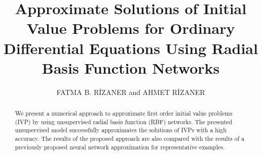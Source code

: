 \documentclass{mc}
\begin{document}


\title[How to use the {\sf mc.cls} class file]{Approximate Solutions of Initial Value Problems for Ordinary Differential Equations Using Radial Basis Function Networks}




\author[AUTHOR1 and AUTHOR2]{FATMA B. R{\.I}ZANER and AHMET R{\.I}ZANER\comma\corrauth}
\address{\ Department of Mathematics, Eastern Mediterranean University, Famagusta, North Cyprus, Mersin 10, Turkey\\   \ Department of Information Technology, Eastern Mediterranean University, Famagusta, North Cyprus, Mersin 10, Turkey}
%
%
%



\begin{abstract}
We present a numerical approach to approximate first order initial value problems (IVP) by using unsupervised radial basis function (RBF) networks. The presented unsupervised model successfully approximates the solutions of IVPs with a high accuracy. The results of the proposed approach are also compared with the results of a previously proposed neural network approximation for representative examples.
\end{abstract}

\end{document}
